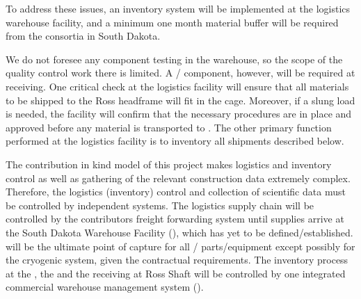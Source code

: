 To address these issues, an inventory system will be implemented at the logistics warehouse facility, and a minimum one month material buffer will be required from the consortia in South Dakota.

We do not foresee any component testing in the warehouse, so the scope of the quality control work there is limited. A / component, however, will be required at receiving. One critical  check at the logistics facility will ensure that all materials to be shipped to the Ross headframe will fit in the cage. Moreover, if a slung load is needed, the facility will confirm that the necessary procedures are in place and approved before any material is transported to . The other primary  function performed at the logistics facility is to inventory all shipments described below.

The contribution in kind model of this project makes logistics and inventory control as well as gathering of the relevant construction data extremely complex. Therefore, the logistics (inventory) control and collection of scientific data must be controlled by independent systems. 
The logistics supply chain will be controlled by the contributors freight forwarding system until supplies arrive at the South Dakota Warehouse Facility (), which has yet to be defined/established.   will be the ultimate point of capture for all / parts/equipment except possibly for the cryogenic system, given the contractual requirements.
The inventory process at the , the  and the  receiving at Ross Shaft will be controlled by one integrated commercial warehouse management system (). 

